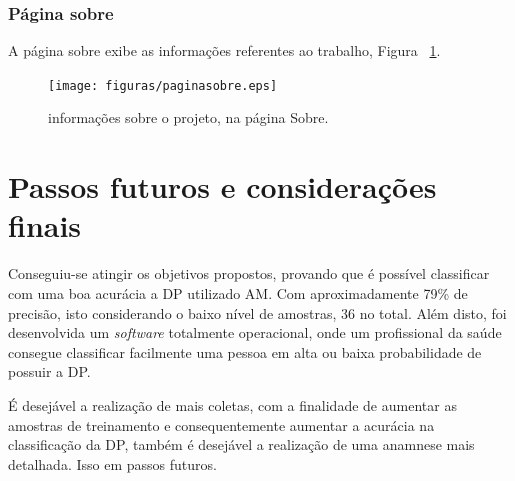 \subsubsection{Página sobre}
A página sobre exibe as informações referentes ao trabalho, Figura ~\ref{fsobre}.
\begin{figure}[!htb]
    \centering
    \texttt{[image: figuras/paginasobre.eps]}
    \caption{informações sobre o projeto, na página Sobre.}
    \label{fsobre}
\end{figure}

\section{Passos futuros e considerações finais}
   Conseguiu-se atingir os objetivos propostos, provando que é possível classificar com uma boa acurácia a DP utilizado AM. Com aproximadamente 79\% de precisão, isto considerando o baixo nível de amostras, 36 no total. Além disto, foi desenvolvida um \textit{software} totalmente operacional, onde um profissional da saúde consegue classificar facilmente uma pessoa em alta ou baixa probabilidade de possuir a DP.

   É desejável a realização de mais coletas, com a finalidade de aumentar as amostras de treinamento e consequentemente aumentar a acurácia na classificação da DP, também é desejável a realização de uma anamnese mais detalhada. Isso em passos futuros.
